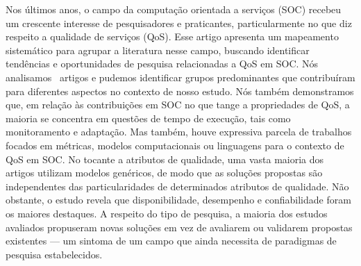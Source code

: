 \documentclass[conference]{IEEEtran}
\begin{document}
\begin{resumo}
  Nos \'{u}ltimos anos, o campo da computa\c{c}\~{a}o orientada a serviços (SOC) recebeu um crescente interesse de pesquisadores e praticantes, particularmente no que diz respeito a qualidade de servi\c{c}os (QoS). Esse artigo apresenta um mapeamento sistem\'{a}tico para agrupar a literatura nesse campo, buscando identificar tend\^{e}ncias e oportunidades de pesquisa relacionadas a QoS em SOC. N\'{o}s analisamos \AcceptedPubs~artigos e pudemos identificar grupos predominantes que contribu\'{i}ram para diferentes aspectos no contexto de nosso estudo. N\'{o}s tamb\'{e}m demonstramos que, em rela\c{c}\~{a}o \`{a}s contribui\c{c}\~{o}es em SOC no que tange a propriedades de QoS, a maioria se concentra em quest\~{o}es de tempo de execu\c{c}\~{a}o, tais como monitoramento e adapta\c{c}\~{a}o. Mas tamb\'{e}m, houve expressiva parcela de trabalhos focados em m\'{e}tricas, modelos computacionais ou linguagens para o contexto de QoS em SOC. No tocante a atributos de qualidade, uma vasta maioria dos artigos utilizam modelos gen\'{e}ricos, de modo que as solu\c{c}\~{o}es propostas s\~{a}o independentes das particularidades de determinados atributos de qualidade. N\~{a}o obstante, o estudo revela que disponibilidade, desempenho e confiabilidade foram os maiores destaques. A respeito do tipo de pesquisa, a maioria dos estudos avaliados propuseram novas solu\c{c}\~{o}es em vez de avaliarem ou validarem propostas existentes --- um sintoma de um campo que ainda necessita de paradigmas de pesquisa estabelecidos.
\end{resumo}



%
\IEEEpeerreviewmaketitle
\end{document}
